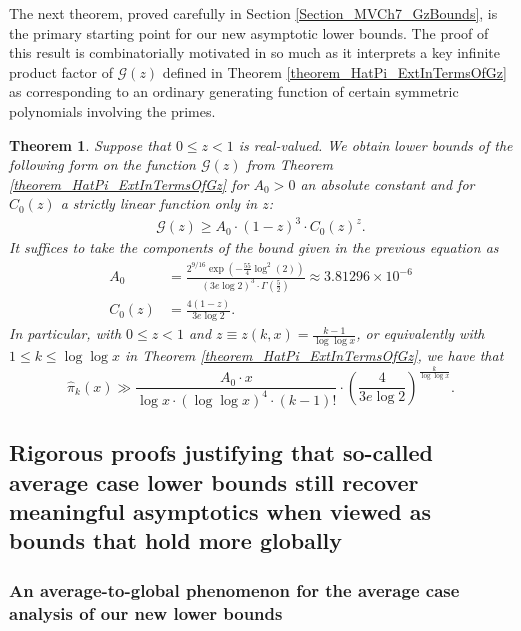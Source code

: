 \documentclass[11pt,reqno,a4letter]{article}
\numberwithin{figure}{section}
\numberwithin{table}{section}
\theoremstyle{plain}
\newtheorem{theorem}{Theorem}
\numberwithin{theorem}{section}
\theoremstyle{definition}
\newcommand{\SuccSim}[0]{\overset{_{\scriptsize{\blacktriangle}}}{\succsim}}
\renewcommand{\SuccSim}[0]{\ensuremath{\gg}}
\begin{document}
The next theorem, proved carefully in Section \ref{Section_MVCh7_GzBounds}, 
is the primary starting point for our new asymptotic lower bounds. 
The proof of this result is combinatorially motivated in so much as it interprets a key 
infinite product factor of $\mathcal{G}(z)$ defined in 
Theorem \ref{theorem_HatPi_ExtInTermsOfGz} 
as corresponding to an ordinary generating function of certain symmetric polynomials 
involving the primes. 

\begin{theorem} 
\label{theorem_GFs_SymmFuncs_SumsOfRecipOfPowsOfPrimes} 
\label{cor_BoundsOnGz_FromMVBook_initial_stmt_v1} 
Suppose that $0 \leq z < 1$ is real-valued. 
We obtain lower bounds of the following form on the function 
$\mathcal{G}(z)$ from Theorem \ref{theorem_HatPi_ExtInTermsOfGz} 
for $A_0 > 0$ an absolute constant and for 
$C_0(z)$ a strictly linear function only in $z$: 
\begin{align*} 
\mathcal{G}(z) \geq A_0 \cdot (1-z)^{3} \cdot C_0(z)^{z}. 
\end{align*} 
It suffices to take the components of the bound given in the previous equation as 
\begin{align*}
A_0 & = \frac{2^{9/16} \exp\left(-\frac{55}{4} \log^2(2)\right)}{ 
     (3e\log 2)^3 \cdot \Gamma\left(\frac{5}{2}\right)} \approx 3.81296 \times 10^{-6} \\ 
C_0(z) & = \frac{4(1-z)}{3e \log 2}. 
\end{align*} 
In particular, with $0 \leq z < 1$ and 
$z \equiv z(k, x) = \frac{k-1}{\log\log x}$, 
or equivalently with $1 \leq k \leq \log\log x$ in Theorem \ref{theorem_HatPi_ExtInTermsOfGz}, 
we have that 
\[
\widehat{\pi}_k(x) \SuccSim \frac{A_0 \cdot x}{\log x \cdot (\log\log x)^4 \cdot (k-1)!} \cdot 
     \left(\frac{4}{3e\log 2}\right)^{\frac{k}{\log\log x}}.
\]
\end{theorem} 

\subsection{Rigorous proofs justifying that so-called average case lower bounds still recover 
            meaningful asymptotics when viewed as bounds that hold more globally} 
\label{subSection_Intro_RigorToTheAverageCaseEstimates} 

\subsubsection{An average-to-global phenomenon for the average case analysis of our new lower bounds} 
\end{document}
